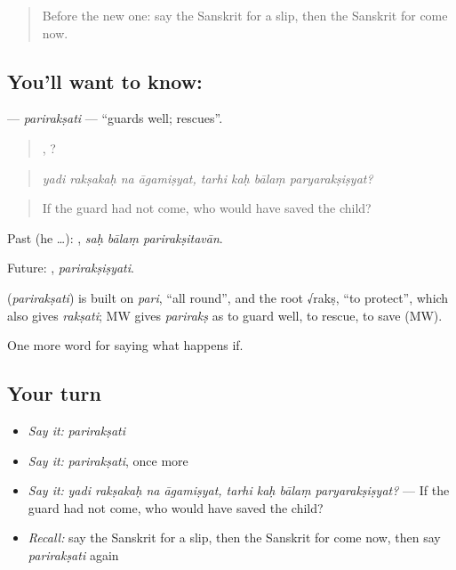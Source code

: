 \label{lesson:SA-C553-pariraksati}



\begin{quote}
Before the new one: say the Sanskrit for a slip, then the Sanskrit for come now.
\end{quote}

\subsection*{You'll want to know: }
\textbf{} — \emph{parirakṣati} — \textquotedblleft{}guards well; rescues\textquotedblright{}.

\begin{quote}
   ,    ?
\end{quote}

\begin{quote}
\emph{yadi rakṣakaḥ na āgamiṣyat, tarhi kaḥ bālaṃ paryarakṣiṣyat?}
\end{quote}

\begin{quote}
If the guard had not come, who would have saved the child?
\end{quote}

Past (he …):   , \emph{saḥ bālaṃ parirakṣitavān}.

Future: , \emph{parirakṣiṣyati}.

\begin{cousinweb}
\textbf{} (\emph{parirakṣati}) is built on \emph{pari}, \textquotedblleft{}all round\textquotedblright{}, and the root √rakṣ, \textquotedblleft{}to protect\textquotedblright{}, which also gives \emph{rakṣati}; MW gives \emph{parirakṣ} as to guard well, to rescue, to save (MW).
\end{cousinweb}

\begin{grammarlens}[title={What you've built}]
One more word for saying what happens if.
\end{grammarlens}

\subsection*{Your turn}
\begin{itemize}
\raggedright
  \item \emph{Say it:} \emph{parirakṣati}
  \item \emph{Say it:} \emph{parirakṣati}, once more
  \item \emph{Say it:} \emph{yadi rakṣakaḥ na āgamiṣyat, tarhi kaḥ bālaṃ paryarakṣiṣyat?} — If the guard had not come, who would have saved the child?
  \item \emph{Recall:} say the Sanskrit for a slip, then the Sanskrit for come now, then say \emph{parirakṣati} again
\end{itemize}

